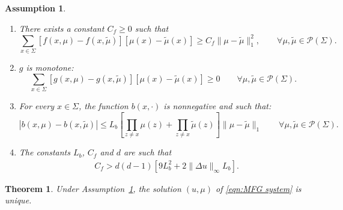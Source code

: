 \documentclass[10pt,a4paper]{amsart}
\newtheorem{assumption}{Assumption}
\newtheorem{theorem}{Theorem}
\newcommand{\calP}{\mathcal{P}}
\newcommand{\norm}[1]{\|#1\|}
\begin{document}
\begin{assumption}\label{ass:uniqueness}
    ~
    \begin{enumerate}
        \item[(A1)] There exists a constant $C_f \ge 0$ such that
        \begin{equation*}
            \sum_{x \in \Sigma} [f(x,\mu) - f(x,\tilde{\mu})][\mu(x) - \tilde{\mu}(x)] \ge C_f \norm{\mu - \tilde{\mu}}_1^2, \qquad \forall \mu, \tilde{\mu} \in \calP(\Sigma).
        \end{equation*}
        \item[(A2)] $g$ is monotone: 
        \begin{equation*}
            \sum_{x \in \Sigma} [g(x,\mu) -g(x,\tilde{\mu})][\mu(x) - \tilde{\mu}(x)] \geq 0 \qquad \forall \mu, \tilde{\mu} \in \calP(\Sigma).
        \end{equation*}
        \item[(A3)] For every $x \in \Sigma$, the function $b(x,\cdot)$ is nonnegative and such that:
        \begin{equation*}
            |b(x,\mu) - b(x,\tilde{\mu})| \leq L_{b} \left[\prod_{z \neq x} \mu(z) + \prod_{z \neq x} \tilde{\mu}(z) \right] \norm{\mu - \tilde{\mu}}_{1} \qquad \forall \mu, \tilde{\mu} \in \calP(\Sigma).
        \end{equation*}
        \item[(A4)] The constants $L_b$, $C_f$ and $d$ are such that
        \begin{align*}
            &C_f > d(d-1) [9 L_b^2 + 2 \norm{\Delta u}_\infty L_b].
        \end{align*}
    \end{enumerate}
\end{assumption}

\begin{theorem}
    Under Assumption~\ref{ass:uniqueness}, the solution $(u,\mu)$ of \eqref{eqn:MFG system} is unique.
\end{theorem}
\end{document}
